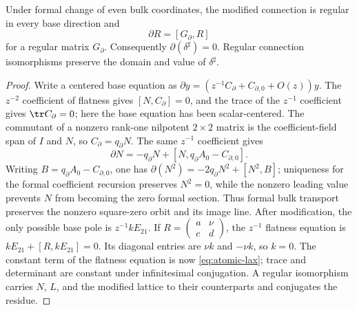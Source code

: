 \begin{proposition}
\label{prop:rank2-rigidity}
%
%
Under formal change of even bulk coordinates, the modified connection is
regular in every base direction and
\begin{equation}
 \partial R=[G_\partial,R]
 \label{eq:atomic-lax}
\end{equation}
for a regular matrix \(G_\partial\).  Consequently
\(\partial(\delta^\sharp)=0\).  Regular connection isomorphisms preserve the
domain and value of \(\delta^\sharp\).
\end{proposition}

\begin{proof}
Write a centered base equation as
\(\partial y=(z^{-1}C_\partial+C_{\partial,0}+O(z))y\).  The
\(z^{-2}\) coefficient of flatness gives \([N,C_\partial]=0\), and the trace
of the \(z^{-1}\) coefficient gives \(\tr C_\partial=0\); here the base
equation has been scalar-centered.  The commutant of a nonzero rank-one
nilpotent \(2\times2\) matrix is the coefficient-field span of \(I\) and
\(N\), so \(C_\partial=q_\partial N\).  The same \(z^{-1}\) coefficient gives
\[
 \partial N=-q_\partial N+
 [N,q_\partial A_0-C_{\partial,0}].
\]
Writing \(B=q_\partial A_0-C_{\partial,0}\), one has
\(\partial(N^2)=-2q_\partial N^2+[N^2,B]\); uniqueness for the formal
coefficient recursion preserves \(N^2=0\), while the nonzero leading value
prevents \(N\) from becoming the zero formal section.  Thus formal bulk
transport preserves the nonzero square-zero orbit and its
image line.  After modification, the only possible base
pole is \(z^{-1}kE_{21}\).  If
\(R=\left(\begin{smallmatrix}a&\nu\\c&d\end{smallmatrix}\right)\), the
\(z^{-1}\) flatness equation is
\(kE_{21}+[R,kE_{21}]=0\).  Its diagonal entries are \(\nu k\) and
\(-\nu k\), so \(k=0\).  The constant term of the flatness equation is now
\eqref{eq:atomic-lax}; trace and determinant are constant under infinitesimal
conjugation.  A regular isomorphism carries \(N\), \(L\), and the modified
lattice to their counterparts and conjugates the residue.
\end{proof}


